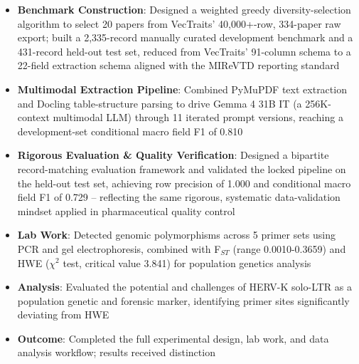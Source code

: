 \documentclass{my-resume}
\begin{document}
\begin{itemize}[parsep=0.2ex]
  \item \textbf{Benchmark Construction}: Designed a weighted greedy diversity-selection algorithm to select 20 papers from VecTraits' 40,000+-row, 334-paper raw export; built a 2,335-record manually curated development benchmark and a 431-record held-out test set, reduced from VecTraits' 91-column schema to a 22-field extraction schema aligned with the MIReVTD reporting standard
  \item \textbf{Multimodal Extraction Pipeline}: Combined PyMuPDF text extraction and Docling table-structure parsing to drive Gemma 4 31B IT (a 256K-context multimodal LLM) through 11 iterated prompt versions, reaching a development-set conditional macro field F1 of 0.810
  \item \textbf{Rigorous Evaluation \& Quality Verification}: Designed a bipartite record-matching evaluation framework and validated the locked pipeline on the held-out test set, achieving row precision of 1.000 and conditional macro field F1 of 0.729 -- reflecting the same rigorous, systematic data-validation mindset applied in pharmaceutical quality control
\end{itemize}

\begin{itemize}[parsep=0.2ex]
  \item \textbf{Lab Work}: Detected genomic polymorphisms across 5 primer sets using PCR and gel electrophoresis, combined with F$_{ST}$ (range 0.0010-0.3659) and HWE ($\chi^2$ test, critical value 3.841) for population genetics analysis
  \item \textbf{Analysis}: Evaluated the potential and challenges of HERV-K solo-LTR as a population genetic and forensic marker, identifying primer sites significantly deviating from HWE
  \item \textbf{Outcome}: Completed the full experimental design, lab work, and data analysis workflow; results received distinction
\end{itemize}
\end{document}
